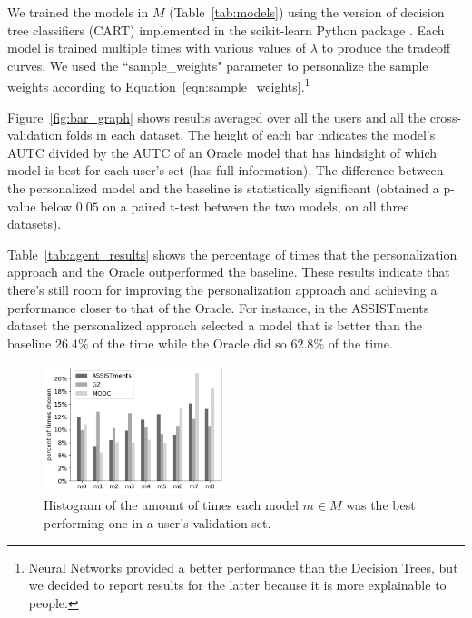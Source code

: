 \documentclass[letterpaper]{article} %
\theoremstyle{definition}
\newcommand{\kibitz}[2]{\ifnum\Comments=1{\color{#1}{#2}}\fi}
\newcommand{\ym}[1]{\kibitz{blue}{[YM:#1]}}
\newcommand{\li}[1]{\kibitz{brown}{[LL:#1]}}
\begin{document}
We trained the models in $M$ (Table~\ref{tab:models}) using the version of decision tree classifiers (CART) implemented in the scikit-learn Python package \cite{scikit-learn}. Each model is trained multiple times with various values of $\lambda$ to produce the tradeoff curves.
We  used the ``sample\_weights" parameter to personalize the sample weights  according to Equation~\ref{eqn:sample_weights}.\footnote{Neural Networks provided a better performance than the Decision Trees, but we decided to report results for the latter because it is more explainable to people.}

Figure~\ref{fig:bar_graph} shows results averaged over all the users and all the cross-validation folds in each dataset. The height of each bar indicates the model's AUTC divided by the AUTC of an Oracle model that has hindsight of which model is best for each user's set (has full information).
The difference between the personalized model and the baseline is statistically significant (obtained a p-value below $0.05$ on a paired t-test between the two models, on all three datasets).

Table~\ref{tab:agent_results} shows the percentage of times that the personalization approach and the Oracle outperformed the baseline. These results indicate that there's still room for improving the personalization approach and achieving a performance closer to that of the Oracle. For instance, in the ASSISTments dataset the personalized approach selected a model that is better than the baseline $26.4\%$ of the time while the Oracle did so $62.8\%$ of the time.

\begin{figure}
     \centering
     \includegraphics[width=0.47\textwidth]{model_counts}
     \caption{Histogram of the amount of times each model $m\in M$ was the best performing one in a user's validation set.}
    \label{fig:model_counts}
\end{figure}
\end{document}
